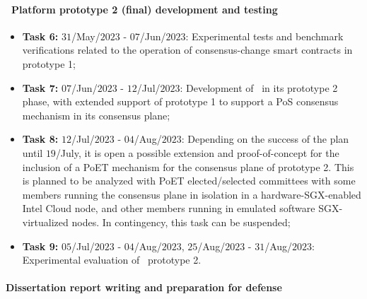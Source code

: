 \paragraph{\mysystem~Platform prototype 2 (final) development and testing}

\begin{itemize}    
    \item \textbf{Task 6:} $31$/May/$2023$ - $07$/Jun/$2023$: Experimental tests and benchmark verifications related to the operation of consensus-change smart contracts in prototype 1;

    \item \textbf{Task 7:} $07$/Jun/$2023$ - $12$/Jul/$2023$: Development of \mysystem~in its prototype 2 phase, with extended support of prototype 1 to support a \gls{PoS} consensus mechanism in its consensus plane;

    \item \textbf{Task 8:} $12$/Jul/$2023$ - $04$/Aug/$2023$: Depending on the success of the plan until $19$/July, it is open a possible extension and proof-of-concept for the inclusion of a \gls{PoET} mechanism for the consensus plane of prototype 2. This is planned to be analyzed with \gls{PoET} elected/selected committees with some members running the consensus plane in isolation in a hardware-\gls{SGX}-enabled Intel Cloud node, and other members running in emulated software \gls{SGX}-virtualized nodes. In contingency, this task can be suspended;

    \item \textbf{Task 9:} $05$/Jul/$2023$ - $04$/Aug/$2023$, $25$/Aug/$2023$ - $31$/Aug/$2023$: Experimental evaluation of \mysystem~prototype 2.
\end{itemize}




\paragraph{Dissertation report writing and preparation for defense}

